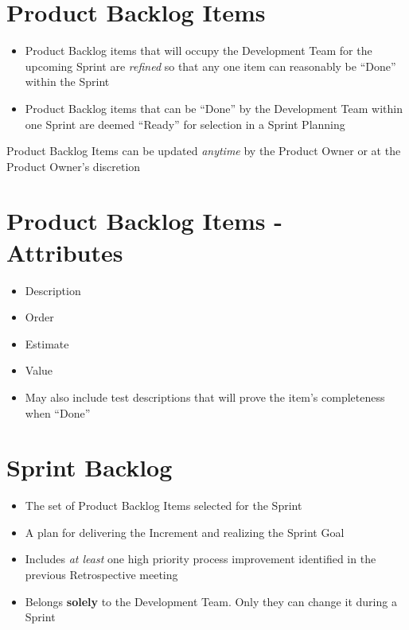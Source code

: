 \documentclass[a4paper,11pt,twocolumn]{article}
\begin{document}
\section*{Product Backlog Items}
\begin{itemize}
	\item Product Backlog items that will occupy the Development Team for the upcoming Sprint are \textit{refined} so that any one item can reasonably be ``Done'' within the Sprint
	\item Product Backlog items that can be ``Done'' by the Development Team within one Sprint are deemed ``Ready'' for selection in a Sprint Planning
\end{itemize}

\begin{tcolorbox}[colback=black!8!white,colframe=gray!50!black,title=Note,sharp corners,fonttitle=\normalsize\bfseries,fontupper=\normalsize,left=0.7em,right=0.7em]
	Product Backlog Items can be updated \textit{anytime} by the Product Owner or at the Product Owner's discretion
\end{tcolorbox}

\section*{Product Backlog Items - Attributes}
\begin{itemize}
	\item Description
	\item Order
	\item Estimate
	\item Value
	\item May also include test descriptions that will prove the item's completeness when ``Done''
\end{itemize}





\section*{Sprint Backlog}
\begin{itemize}
	\item The set of Product Backlog Items selected for the Sprint
	\item A plan for delivering the Increment and realizing the Sprint Goal
	\item Includes \textit{at least} one high priority process improvement identified in the previous Retrospective meeting
	\item Belongs \textbf{solely} to the Development Team. Only they can change it during a Sprint
\end{itemize}
\end{document}
